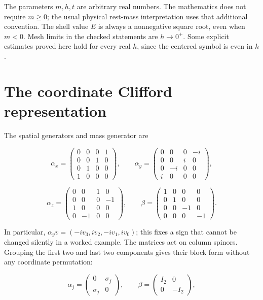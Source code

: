 The parameters \(m,h,t\) are arbitrary real numbers. The mathematics
does not require \(m\ge0\); the usual physical rest-mass interpretation
uses that additional convention. The shell value \(E\) is always a
nonnegative square root, even when \(m<0\). Mesh limits in the checked
statements are \(h\to0^+\). Some explicit estimates proved here hold for
every real \(h\), since the centered symbol is even in \(h\).

\hypertarget{the-coordinate-clifford-representation}{%
\section{The coordinate Clifford
representation}\label{the-coordinate-clifford-representation}}

The spatial generators and mass generator are

\[
\alpha_x=
\begin{pmatrix}
0&0&0&1\\
0&0&1&0\\
0&1&0&0\\
1&0&0&0
\end{pmatrix},
\qquad
\alpha_y=
\begin{pmatrix}
0&0&0&-i\\
0&0&i&0\\
0&-i&0&0\\
i&0&0&0
\end{pmatrix},
\]

\[
\alpha_z=
\begin{pmatrix}
0&0&1&0\\
0&0&0&-1\\
1&0&0&0\\
0&-1&0&0
\end{pmatrix},
\qquad
\beta=
\begin{pmatrix}
1&0&0&0\\
0&1&0&0\\
0&0&-1&0\\
0&0&0&-1
\end{pmatrix}.
\]

In particular, \(\alpha_yv=(-iv_3,iv_2,-iv_1,iv_0)\); this fixes a sign
that cannot be changed silently in a worked example. The matrices act on
column spinors. Grouping the first two and last two components gives
their block form without any coordinate permutation:

\[
\alpha_j=
\begin{pmatrix}0&\sigma_j\\\sigma_j&0\end{pmatrix},
\qquad
\beta=\begin{pmatrix}I_2&0\\0&-I_2\end{pmatrix},
\]

